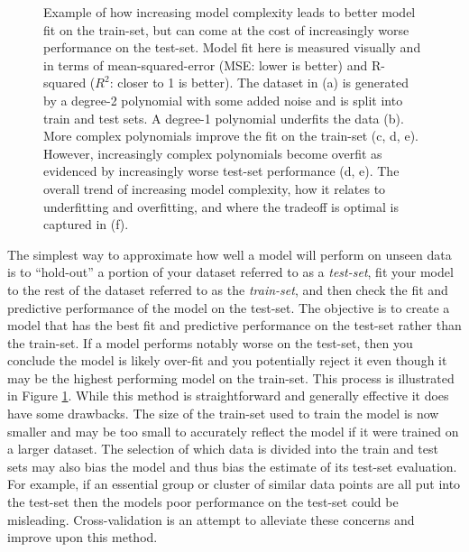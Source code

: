 \begin{figure}
	\caption{Example of how increasing model complexity leads to better model fit on the train-set, but can come at the cost of increasingly worse performance on the test-set. Model fit here is measured visually and in terms of mean-squared-error (MSE: lower is better) and R-squared ($R^2$: closer to 1 is better). The dataset in (a) is generated by a degree-2 polynomial with some added noise and is split into train and test sets. A degree-1 polynomial underfits the data (b). More complex polynomials improve the fit on the train-set (c, d, e). However, increasingly complex polynomials become overfit as evidenced by increasingly worse test-set performance (d, e). The overall trend of increasing model complexity, how it relates to underfitting and overfitting, and where the tradeoff is optimal is captured in (f).}
	\label{fig:overfitting_example}
\end{figure}

The simplest way to approximate how well a model will perform on unseen data is to ``hold-out'' a portion of your dataset referred to as a \textit{test-set}, fit your model to the rest of the dataset referred to as the \textit{train-set}, and then check the fit and predictive performance of the model on the test-set. The objective is to create a model that has the best fit and predictive performance on the test-set rather than the train-set. If a model performs notably worse on the test-set, then you conclude the model is likely over-fit and you potentially reject it even though it may be the highest performing model on the train-set. This process is illustrated in Figure \ref{fig:overfitting_example}.  While this method is straightforward and generally effective it does have some drawbacks. The size of the train-set used to train the model is now smaller and may be too small to accurately reflect the model if it were trained on a larger dataset. The selection of which data is divided into the train and test sets may also bias the model and thus bias the estimate of its test-set evaluation. For example, if an essential group or cluster of similar data points are all put into the test-set then the models poor performance on the test-set could be misleading. Cross-validation is an attempt to alleviate these concerns and improve upon this method.

